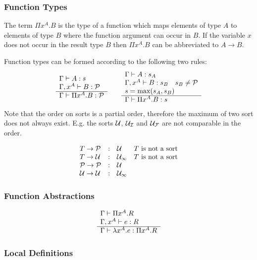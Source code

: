 \subsubsection{Function Types}

The term $\Pi x^A.B$ is the type of a function which maps elements of type $A$
to elements of type $B$ where the function argument can occur in $B$. If the
variable $x$ does not occur in the result type $B$ then $\Pi x^A.B$ can be
abbreviated to $A \to B$.

Function types can be formed according to the following two rules:
%
$$
\begin{array}{l} 
    \Gamma \vdash A: s
    \\
    \Gamma, x^A \vdash B: {\mathcal P}
 \\ \hline 
    \Gamma \vdash \Pi x^A. B : {\mathcal P}
 \end{array}
\quad\quad
\begin{array}{l} 
    \Gamma \vdash A: s_A
    \\
    \Gamma, x^A \vdash B: s_B \quad s_B \ne {\mathcal P}
    \\
    s = \text{max}(s_A, s_B)
 \\ \hline 
    \Gamma \vdash \Pi x^A. B : s
 \end{array}
$$
%
Note that the order on sorts is a partial order, therefore the maximum of two
sort does not always exist. E.g. the sorts ${\mathcal U}$, ${{\mathcal U}_\mathcal I}$ and ${{\mathcal U}_\mathcal F}$ are
not comparable in the order.

$$
\begin{array}{lllll} 
    T \to {\mathcal P}     &:&     {\mathcal U}    & T \text{ is not a sort}
    \\
    T \to {\mathcal U}      &:&     {{\mathcal U}_\infty}    & T \text{ is not a sort}
    \\
    {\mathcal P} \to {\mathcal P} &:&     {\mathcal U}
    \\
    {\mathcal U} \to {\mathcal U}   &:&     {{\mathcal U}_\infty}
 \end{array}
$$







\subsubsection{Function Abstractions}


$$
\begin{array}{l} 
    \Gamma \vdash \Pi x^A.R
    \\
    \Gamma, x^A \vdash e: R
 \\ \hline 
    \Gamma \vdash \lambda x^A. e : \Pi x^A. R
 \end{array}
$$







\subsubsection{Local Definitions}

